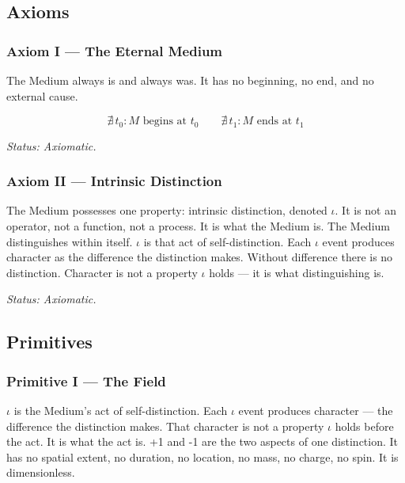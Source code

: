 \documentclass[11pt,letterpaper]{article}
\begin{document}
\subsection{Axioms}
\label{sec:org6adde98}

\subsubsection{Axiom I --- The Eternal Medium}
\label{sec:org01e1888}

The Medium always is and always was. It has no beginning, no end, and no external cause.

\begin{equation}
\nexists\, t_0 : M \text{ begins at } t_0 \qquad \nexists\, t_1 : M \text{ ends at } t_1
\end{equation}

\emph{Status: Axiomatic.}

\subsubsection{Axiom II --- Intrinsic Distinction}
\label{sec:org220b6c5}


The Medium possesses one property: intrinsic distinction, denoted \(\iota\). It is not an operator, not a function, not a process. It is what the Medium is. The Medium distinguishes within itself. \(\iota\) is that act of self-distinction. Each \(\iota\) event produces character as the difference the distinction makes. Without difference there is no distinction. Character is not a property \(\iota\) holds --- it is what distinguishing is.

\emph{Status: Axiomatic.}

\subsection{Primitives}
\label{sec:orge204e9d}

\subsubsection{Primitive I --- The Field}
\label{sec:org90006af}


\(\iota\) is the Medium's act of self-distinction. Each \(\iota\) event produces character --- the difference the distinction makes. That character is not a property \(\iota\) holds before the act. It is what the act is. +1 and -1 are the two aspects of one distinction. It has no spatial extent, no duration, no location, no mass, no charge, no spin. It is dimensionless.
\end{document}
